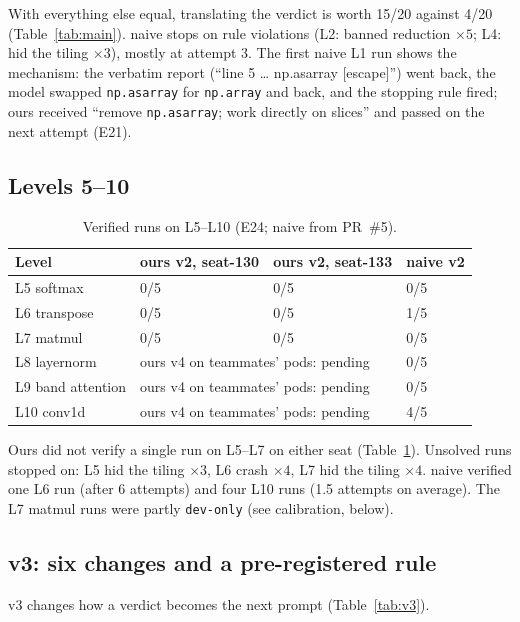 \documentclass[11pt]{article}
\newcommand{\code}[1]{\texttt{#1}}
\newcommand{\E}[1]{E#1}
\begin{document}
With everything else equal, translating the verdict is worth 15/20 against 4/20 (Table~\ref{tab:main}).
naive stops on rule violations (L2: banned reduction $\times5$; L4: hid the tiling $\times3$), mostly at
attempt 3. The first naive L1 run shows the mechanism: the verbatim report (``line 5 \dots{} np.asarray
[escape]'') went back, the model swapped \code{np.asarray} for \code{np.array} and back, and the stopping
rule fired; ours received ``remove \code{np.asarray}; work directly on slices'' and passed on the next
attempt (\E{21}).

\subsection{Levels 5--10}

\begin{table}[h]
\centering
\begin{tabular}{@{}llll@{}}
\toprule
Level & ours v2, seat-130 & ours v2, seat-133 & naive v2 \\
\midrule
L5 softmax & 0/5 & 0/5 & 0/5 \\
L6 transpose & 0/5 & 0/5 & 1/5 \\
L7 matmul & 0/5 & 0/5 & 0/5 \\
L8 layernorm & \multicolumn{2}{l}{ours v4 on teammates' pods: pending} & 0/5 \\
L9 band attention & \multicolumn{2}{l}{ours v4 on teammates' pods: pending} & 0/5 \\
L10 conv1d & \multicolumn{2}{l}{ours v4 on teammates' pods: pending} & 4/5 \\
\bottomrule
\end{tabular}
\caption{Verified runs on L5--L10 (\E{24}; naive from PR~\#5).}
\label{tab:l510}
\end{table}

Ours did not verify a single run on L5--L7 on either seat (Table~\ref{tab:l510}). Unsolved runs stopped
on: L5 hid the tiling $\times3$, L6 crash $\times4$, L7 hid the tiling $\times4$. naive verified one L6
run (after 6 attempts) and four L10 runs (1.5 attempts on average). The L7 matmul runs were partly \code{dev-only} (see calibration, below).

\subsection{v3: six changes and a pre-registered rule}
v3 changes how a verdict becomes the next prompt (Table~\ref{tab:v3}).
\end{document}
